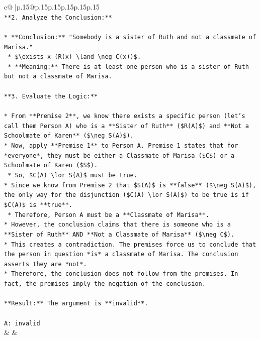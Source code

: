 \documentclass{article}
\begin{document}
{\begin{supertabular}{c@{$\;$}|p{.15\linewidth}@{}p{.15\linewidth}p{.15\linewidth}p{.15\linewidth}p{.15\linewidth}p{.15\linewidth}}
{{{\\ 
\texttt{**2. Analyze the Conclusion:**} \\
\\ 
\texttt{*   **Conclusion:** "Somebody is a sister of Ruth and not a classmate of Marisa."} \\
\texttt{    *   \$\textbackslash{}exists x (R(x) \textbackslash{}land \textbackslash{}neg C(x))\$.} \\
\texttt{    *   **Meaning:** There is at least one person who is a sister of Ruth but not a classmate of Marisa.} \\
\\ 
\texttt{**3. Evaluate the Logic:**} \\
\\ 
\texttt{*   From **Premise 2**, we know there exists a specific person (let's call them Person A) who is a **Sister of Ruth** (\$R(A)\$) and **Not a Schoolmate of Karen** (\$\textbackslash{}neg S(A)\$).} \\
\texttt{*   Now, apply **Premise 1** to Person A. Premise 1 states that for *everyone*, they must be either a Classmate of Marisa (\$C\$) or a Schoolmate of Karen (\$S\$).} \\
\texttt{    *   So, \$C(A) \textbackslash{}lor S(A)\$ must be true.} \\
\texttt{*   Since we know from Premise 2 that \$S(A)\$ is **false** (\$\textbackslash{}neg S(A)\$), the only way for the disjunction (\$C(A) \textbackslash{}lor S(A)\$) to be true is if \$C(A)\$ is **true**.} \\
\texttt{    *   Therefore, Person A must be a **Classmate of Marisa**.} \\
\texttt{*   However, the conclusion claims that there is someone who is a **Sister of Ruth** AND **Not a Classmate of Marisa** (\$\textbackslash{}neg C\$).} \\
\texttt{*   This creates a contradiction. The premises force us to conclude that the person in question *is* a classmate of Marisa. The conclusion asserts they are *not*.} \\
\texttt{*   Therefore, the conclusion does not follow from the premises. In fact, the premises imply the negation of the conclusion.} \\
\\ 
\texttt{**Result:** The argument is **invalid**.} \\
\\ 
\texttt{A: invalid} \\
            }
        }
    }
    & & \\ \\


\end{supertabular}}
\end{document}
